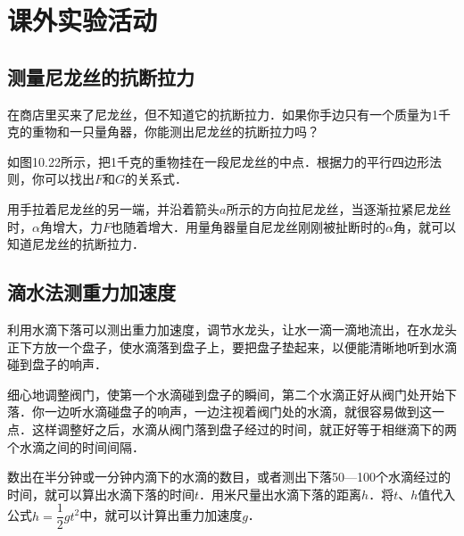 \chapter{课外实验活动}
\setcounter{section}{16}
\section{测量尼龙丝的抗断拉力}
在商店里买来了尼龙丝，但不知道它的抗断拉力．如果你手边只有一个质量为1千克的重物和一只量角器，你能测出尼龙丝的抗断拉力吗？

如图10.22所示，把1千克的重物挂在一段尼龙丝的中点．根据力的平行四边形法则，你可以找出$F$和$G$的关系式．

用手拉着尼龙丝的另一端，并沿着箭头$a$所示的方向拉尼龙丝，当逐渐拉紧尼龙丝时，$\alpha$角增大，力$F$也随着增大．用量角器量自尼龙丝刚刚被扯断时的$\alpha$角，就可以知道尼龙丝的抗断拉力．

\begin{figure}[htp]\centering
    \caption{}
\end{figure}
\newpage
\section{滴水法测重力加速度}

利用水滴下落可以测出重力加速度，调节水龙头，让水一滴一滴地流出，在水龙头正下方放一个盘子，使水滴落到盘子上，要把盘子垫起来，以便能清晰地听到水滴碰到盘子的响声．

细心地调整阀门，使第一个水滴碰到盘子的瞬间，第二个水滴正好从阀门处开始下落．你一边听水滴碰盘子的响声，一边注视着阀门处的水滴，就很容易做到这一点．这样调整好之后，水滴从阀门落到盘子经过的时间，就正好等于相继滴下的两个水滴之间的时间间隔．

数出在半分钟或一分钟内滴下的水滴的数目，或者测出下落50—100个水滴经过的时间，就可以算出水滴下落的时间$t$．用米尺量出水滴下落的距离$h$．将$t$、$h$值代入公式$h=\dfrac{1}{2}gt^2$中，就可以计算出重力加速度$g$．

